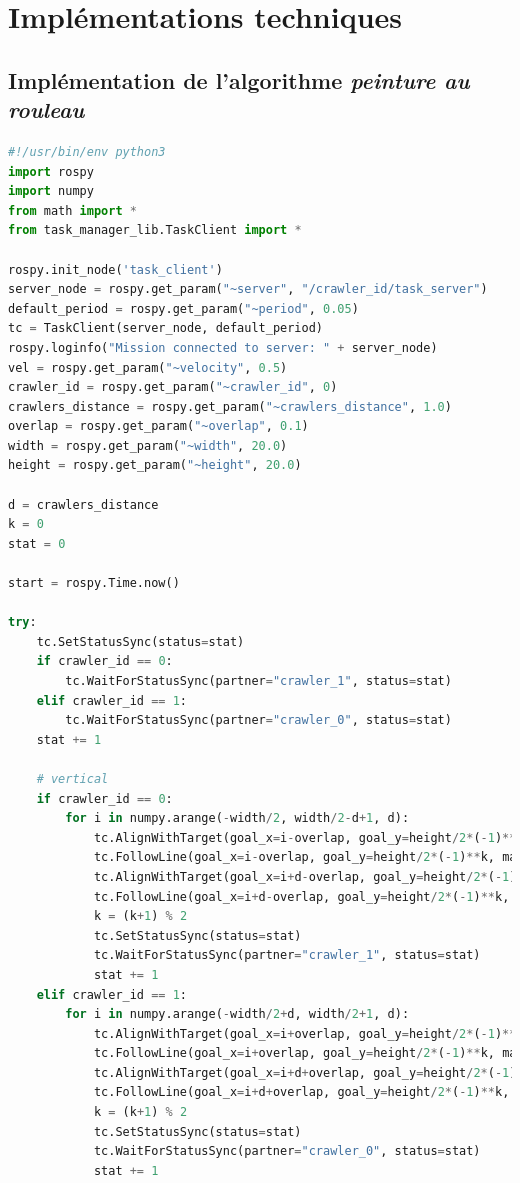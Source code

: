 \documentclass[francais,RandD]{rapportPFE}
\begin{document}
	\section{Implémentations techniques}
		\label{annexe:implementations}
		\subsection{Implémentation de l'algorithme \textit{peinture au rouleau}}
			\begin{lstlisting}[language=Python,caption={Implémentation de l'algorithme de peinture au rouleau},label=lst:peinture_au_rouleau]
#!/usr/bin/env python3
import rospy
import numpy
from math import *
from task_manager_lib.TaskClient import *

rospy.init_node('task_client')
server_node = rospy.get_param("~server", "/crawler_id/task_server")
default_period = rospy.get_param("~period", 0.05)
tc = TaskClient(server_node, default_period)
rospy.loginfo("Mission connected to server: " + server_node)
vel = rospy.get_param("~velocity", 0.5)
crawler_id = rospy.get_param("~crawler_id", 0)
crawlers_distance = rospy.get_param("~crawlers_distance", 1.0)
overlap = rospy.get_param("~overlap", 0.1)
width = rospy.get_param("~width", 20.0)
height = rospy.get_param("~height", 20.0)

d = crawlers_distance
k = 0
stat = 0

start = rospy.Time.now()

try:
	tc.SetStatusSync(status=stat)
	if crawler_id == 0:
		tc.WaitForStatusSync(partner="crawler_1", status=stat)
	elif crawler_id == 1:
		tc.WaitForStatusSync(partner="crawler_0", status=stat)
	stat += 1

	# vertical
	if crawler_id == 0:
		for i in numpy.arange(-width/2, width/2-d+1, d):
			tc.AlignWithTarget(goal_x=i-overlap, goal_y=height/2*(-1)**k)
			tc.FollowLine(goal_x=i-overlap, goal_y=height/2*(-1)**k, max_velocity=vel)
			tc.AlignWithTarget(goal_x=i+d-overlap, goal_y=height/2*(-1)**k)
			tc.FollowLine(goal_x=i+d-overlap, goal_y=height/2*(-1)**k, max_velocity=vel)
			k = (k+1) % 2
			tc.SetStatusSync(status=stat)
			tc.WaitForStatusSync(partner="crawler_1", status=stat)
			stat += 1
	elif crawler_id == 1:
		for i in numpy.arange(-width/2+d, width/2+1, d):
			tc.AlignWithTarget(goal_x=i+overlap, goal_y=height/2*(-1)**k)
			tc.FollowLine(goal_x=i+overlap, goal_y=height/2*(-1)**k, max_velocity=vel)
			tc.AlignWithTarget(goal_x=i+d+overlap, goal_y=height/2*(-1)**k)
			tc.FollowLine(goal_x=i+d+overlap, goal_y=height/2*(-1)**k, max_velocity=vel)
			k = (k+1) % 2
			tc.SetStatusSync(status=stat)
			tc.WaitForStatusSync(partner="crawler_0", status=stat)
			stat += 1


\end{lstlisting}
\end{document}
